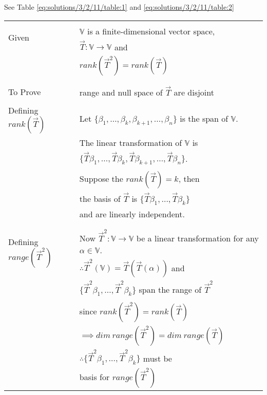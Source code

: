 See Table \ref{eq:solutions/3/2/11/table:1} and \ref{eq:solutions/3/2/11/table:2}


\onecolumn
\begin{longtable}{|l|l|}
\hline
\multirow{3}{*}{Given} & \\
& $\mathbb{V}$ is a finite-dimensional vector space,\\
& $\vec{T}:\mathbb{V} \rightarrow \mathbb{V}$ and\\
& $ rank (\vec{T}^2) = rank (\vec{T})$\\
&\\
\hline
\multirow{3}{*}{To Prove} & \\
& range and null space of $\vec{T}$ are disjoint\\
&\\
\hline
\multirow{3}{*}{Defining $rank(\vec{T})$} & \\
& Let $\lbrace \beta_1,\ldots,\beta_k,\beta_{k+1},\ldots,\beta_n \rbrace$ is the span of $\mathbb{V}$.\\
& \\
& The linear transformation of $\mathbb{V}$ is\\
& $\lbrace \vec{T}\beta_1,\ldots,\vec{T}\beta_k,\vec{T}\beta_{k+1},\ldots,\vec{T}\beta_n \rbrace$.\\
& \\
& Suppose the $rank (\vec{T}) = k$, then \\
& the basis of $\vec{T}$ is $\lbrace \vec{T}\beta_1,\ldots,\vec{T}\beta_k \rbrace$ \\
& and are linearly independent.\\
& \\
\hline
\multirow{3}{*}{Defining $range(\vec{T}^2)$} & \\
& Now $\vec{T}^2 : \mathbb{V} \rightarrow \mathbb{V}$ be a linear transformation for any $\alpha \in \mathbb{V}$.  \\
& $\therefore \vec{T}^2(\mathbb{V}) = \vec{T}(\vec{T}(\alpha))$ and \\
& $\lbrace \vec{T}^2\beta_1,\ldots,\vec{T}^2\beta_k \rbrace$ span the range of $\vec{T}^2$\\
& \\
& since $ rank (\vec{T}^2) = rank (\vec{T})$\\
& $\implies dim \  range (\vec{T}^2) = dim \  range (\vec{T})$\\
& $\therefore \lbrace \vec{T}^2\beta_1,\ldots,\vec{T}^2\beta_k \rbrace$ must be\\
& basis for $range(\vec{T}^2)$\\

\end{longtable}
